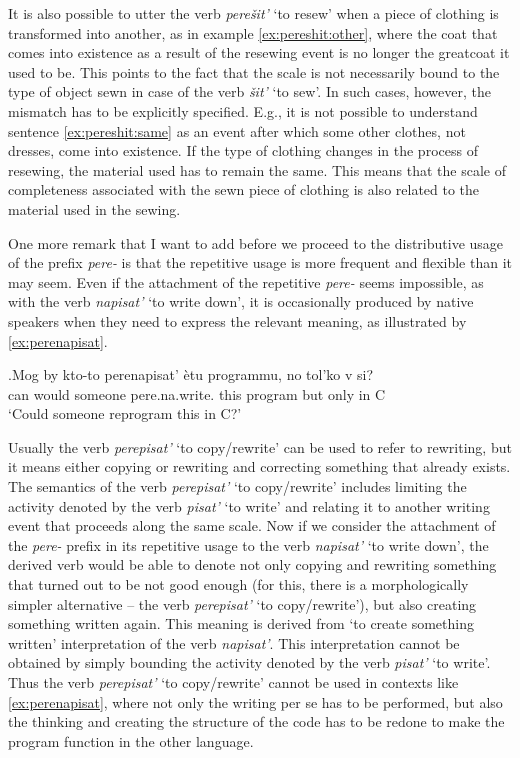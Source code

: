 It is also possible to utter the verb \textit{pere\v{s}it'} `to resew' when a piece of clothing is transformed into another, as in example \ref{ex:pereshit:other}, where the coat that comes into existence as a result of the resewing event is no longer the greatcoat it used to be. This points to the fact that the scale is not necessarily bound to the type of object sewn in case of the verb \textit{\v{s}it'} `to sew'. In such cases, however, the mismatch has to be explicitly specified. E.g., it is not possible to understand sentence \ref{ex:pereshit:same} as an event after which some other clothes, not dresses, come into existence.  If the type of clothing changes in the process of resewing, the material used has to remain the same. This means that the scale of completeness associated with the sewn piece of clothing is also related to the material used in the sewing.


One more remark that I want to add before we proceed to the distributive usage of the prefix \textit{pere-} is that the repetitive usage is more frequent and flexible than it may seem. Even if the attachment of the repetitive \textit{pere-} seems impossible, as with the verb \textit{napisat'} `to write down', it is occasionally produced by native speakers when they need to express the relevant meaning, as illustrated by \ref{ex:perenapisat}. 

\exg.\label{ex:perenapisat}Mog by kto-to perenapisat' \`{e}tu programmu, no tol'ko v si?\\
can would someone pere.na.write. this program but only in C\\
\trans `Could someone reprogram this in C?'

Usually the verb \textit{perepisat'} `to copy/rewrite' can be used to refer to rewriting, but it means either copying or rewriting and correcting something that already exists. The semantics of the verb \textit{perepisat'} `to copy/rewrite' includes limiting the activity denoted by the verb \textit{pisat'} `to write' and relating it to another writing event that proceeds along the same scale. Now if we consider the attachment of the \textit{pere-} prefix in its repetitive usage to the verb \textit{napisat'} `to write down', the derived verb would be able to denote not only copying and rewriting something that turned out to be not good enough (for this, there is a morphologically simpler alternative -- the verb \textit{perepisat'} `to copy/rewrite'), but also creating something written again. This meaning is derived from `to create something written' interpretation of the verb \textit{napisat'}. This interpretation cannot be obtained by simply bounding the activity denoted by the verb \textit{pisat'} `to write'. Thus the verb \textit{perepisat'} `to copy/rewrite' cannot be used in contexts like \ref{ex:perenapisat}, where not only the writing per se has to be performed, but also the thinking and creating the structure of the code has to be redone to make the program function in the other language.

